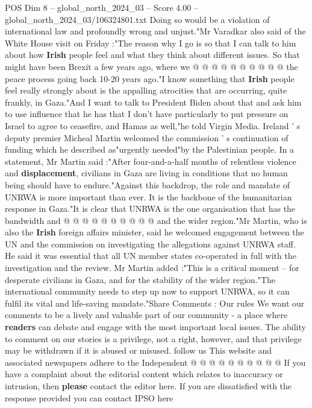 \begin{textsample}{POS Dim 8 – global\_north\_2024\_03 – Score 4.00 – global\_north\_2024\_03/106324801.txt}
Doing so would be a violation of international law and profoundly wrong and unjust."Mr Varadkar also said of the White House visit on Friday :"The reason why I go is so that I can talk to him about how \textbf{Irish} people feel and what they think about different issues.
So that might have been Brexit a few years ago, where we @ @ @ @ @ @ @ @ @ @ the peace process going back 10-20 years ago."I know something that \textbf{Irish} people feel really strongly about is the appalling atrocities that are occurring, quite frankly, in Gaza."And I want to talk to President Biden about that and ask him to use influence that he has that I don't have particularly to put pressure on Israel to agree to ceasefire, and Hamas as well,"he told Virgin Media.
Ireland ' s deputy premier Micheal Martin welcomed the commission ' s continuation of funding which he described as"urgently needed"by the Palestinian people.
In a statement, Mr Martin said :"After four-and-a-half months of relentless violence and \textbf{displacement}, civilians in Gaza are living in conditions that no human being should have to endure."Against this backdrop, the role and mandate of UNRWA is more important than ever.
It is the backbone of the humanitarian response in Gaza."It is clear that UNRWA is the one organisation that has the bandwidth and @ @ @ @ @ @ @ @ @ @ and the wider region."Mr Martin, who is also the \textbf{Irish} foreign affairs minister, said he welcomed engagement between the UN and the commission on investigating the allegations against UNRWA staff.
He said it was essential that all UN member states co-operated in full with the investigation and the review.
Mr Martin added :"This is a critical moment -- for desperate civilians in Gaza, and for the stability of the wider region."The international community needs to step up now to support UNRWA, so it can fulfil its vital and life-saving mandate."Share Comments : Our rules We want our comments to be a lively and valuable part of our community - a place where \textbf{readers} can debate and engage with the most important local issues.
The ability to comment on our stories is a privilege, not a right, however, and that privilege may be withdrawn if it is abused or misused. follow us This website and associated newspapers adhere to the Independent @ @ @ @ @ @ @ @ @ @ If you have a complaint about the editorial content which relates to inaccuracy or intrusion, then \textbf{please} contact the editor here.
If you are dissatisfied with the response provided you can contact IPSO here

\end{textsample}
